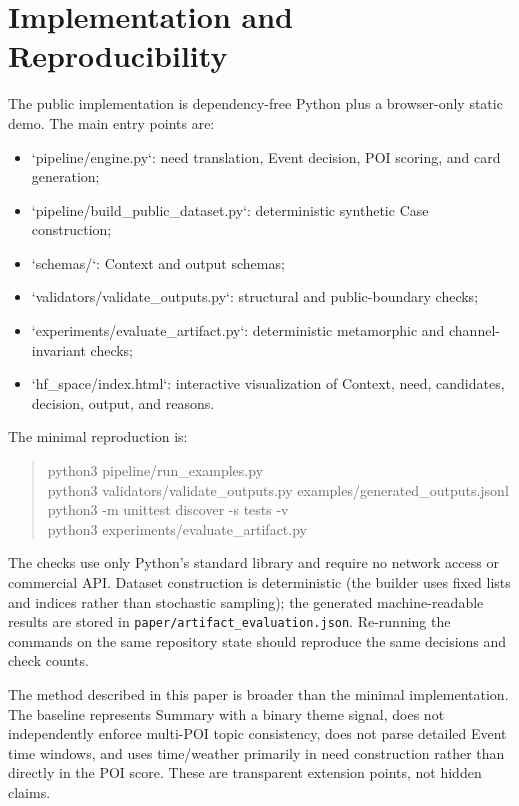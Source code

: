 \documentclass[10pt]{article}
\begin{document}
\section{Implementation and Reproducibility}

The public implementation is dependency-free Python plus a browser-only static demo. The main entry points are:
\begin{itemize}
  \item `pipeline/engine.py`: need translation, Event decision, POI scoring, and card generation;
  \item `pipeline/build\_public\_dataset.py`: deterministic synthetic Case construction;
  \item `schemas/`: Context and output schemas;
  \item `validators/validate\_outputs.py`: structural and public-boundary checks;
  \item `experiments/evaluate\_artifact.py`: deterministic metamorphic and channel-invariant checks;
  \item `hf\_space/index.html`: interactive visualization of Context, need, candidates, decision, output, and reasons.
\end{itemize}
The minimal reproduction is:
\begin{quote}\ttfamily
python3 pipeline/run\_examples.py\\
python3 validators/validate\_outputs.py examples/generated\_outputs.jsonl\\
python3 -m unittest discover -s tests -v\\
python3 experiments/evaluate\_artifact.py
\end{quote}

The checks use only Python's standard library and require no network access or commercial API. Dataset construction is deterministic (the builder uses fixed lists and indices rather than stochastic sampling); the generated machine-readable results are stored in \texttt{paper/artifact\_evaluation.json}. Re-running the commands on the same repository state should reproduce the same decisions and check counts.

The method described in this paper is broader than the minimal implementation. The baseline represents Summary with a binary theme signal, does not independently enforce multi-POI topic consistency, does not parse detailed Event time windows, and uses time/weather primarily in need construction rather than directly in the POI score. These are transparent extension points, not hidden claims.
\end{document}
